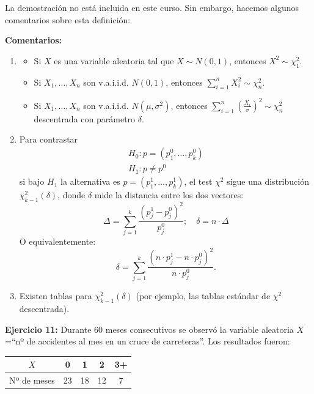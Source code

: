 La demostración no está incluida en este curso. Sin embargo, hacemos algunos comentarios sobre esta definición:

\textbf{Comentarios:} %
\begin{enumerate}
    \item   \begin{itemize}
        \item Si $X$ es una variable aleatoria tal que $X \sim N(0,1)$, entonces $X^2 \sim \chi^2_1$.
        \item Si $X_1, \dots, X_n$ son v.a.i.i.d. $N(0,1)$, entonces $\sum_{i=1}^{n} X_i^2 \sim \chi^2_n$.
        \item Si $X_1, \dots, X_n$ son v.a.i.i.d. $N(\mu, \sigma^2)$, entonces 
        $
        \sum_{i=1}^{n} \left( \frac{X_i}{\sigma} \right)^2 \sim \chi^2_n
        $
        descentrada con parámetro $\delta$.
    \end{itemize}
    \item Para contrastar 
    \[
    \begin{matrix}
        H_0: p=(p_1^0, \dots, p_k^0) \\
        H_1: p \neq p^0
    \end{matrix}
    \]
    si bajo $H_1$ la alternativa 
    es $p = (p_1^1, \dots, p_k^1)$, el test $\chi^2$ sigue 
    una distribución $\chi^2_{k-1}(\delta)$, donde $\delta$ 
    mide la distancia entre los dos vectores:
    \[
    \Delta = \sum_{j=1}^{k} \frac{(p_j^1 - p_j^0)^2}{p_j^0}; \quad \delta = n \cdot \Delta
    \]
    O equivalentemente:
    \[
    \delta = \sum_{j=1}^{k} \frac{\left( n \cdot p_j^1 - n \cdot p_j^0 \right)^2}{n \cdot p_j^0}.
    \]
    \item Existen tablas para $\chi_{k-1}^{2}(\delta)$ (por ejemplo, las tablas estándar de $\chi^2$ descentrada).
\end{enumerate}

\textbf{Ejercicio 11:}  
Durante 60 meses consecutivos se observó la variable aleatoria $X$=``nº de accidentes al mes en un cruce de carreteras''. Los resultados fueron:

\begin{table}[!h]
    \centering
    \begin{tabular}{|c|c|c|c|c|}
        \hline
        {$X$} & 0 & 1 & 2 & 3+ \\ \hline
        {Nº de meses} & 23 & 18 & 12 & 7 \\ \hline
    \end{tabular}
\end{table}

